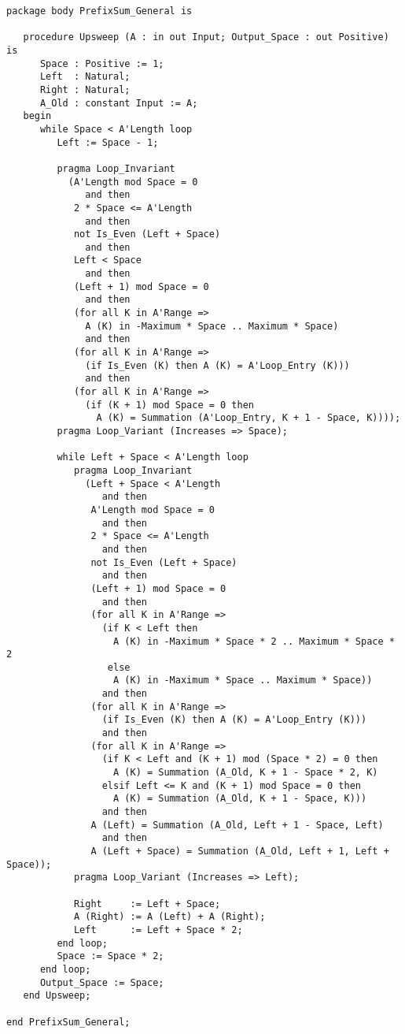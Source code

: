 \documentclass[sttt,draft]{svjour}
\begin{document}
\begin{footnotesize}
\begin{verbatim}
package body PrefixSum_General is

   procedure Upsweep (A : in out Input; Output_Space : out Positive) is
      Space : Positive := 1;
      Left  : Natural;
      Right : Natural;
      A_Old : constant Input := A;
   begin
      while Space < A'Length loop
         Left := Space - 1;

         pragma Loop_Invariant
           (A'Length mod Space = 0
              and then
            2 * Space <= A'Length
              and then
            not Is_Even (Left + Space)
              and then
            Left < Space
              and then
            (Left + 1) mod Space = 0
              and then
            (for all K in A'Range =>
              A (K) in -Maximum * Space .. Maximum * Space)
              and then
            (for all K in A'Range =>
              (if Is_Even (K) then A (K) = A'Loop_Entry (K)))
              and then
            (for all K in A'Range =>
              (if (K + 1) mod Space = 0 then
                A (K) = Summation (A'Loop_Entry, K + 1 - Space, K))));
         pragma Loop_Variant (Increases => Space);

         while Left + Space < A'Length loop
            pragma Loop_Invariant
              (Left + Space < A'Length
                 and then
               A'Length mod Space = 0
                 and then
               2 * Space <= A'Length
                 and then
               not Is_Even (Left + Space)
                 and then
               (Left + 1) mod Space = 0
                 and then
               (for all K in A'Range =>
                 (if K < Left then
                   A (K) in -Maximum * Space * 2 .. Maximum * Space * 2
                  else
                   A (K) in -Maximum * Space .. Maximum * Space))
                 and then
               (for all K in A'Range =>
                 (if Is_Even (K) then A (K) = A'Loop_Entry (K)))
                 and then
               (for all K in A'Range =>
                 (if K < Left and (K + 1) mod (Space * 2) = 0 then
                   A (K) = Summation (A_Old, K + 1 - Space * 2, K)
                 elsif Left <= K and (K + 1) mod Space = 0 then
                   A (K) = Summation (A_Old, K + 1 - Space, K)))
                 and then
               A (Left) = Summation (A_Old, Left + 1 - Space, Left)
                 and then
               A (Left + Space) = Summation (A_Old, Left + 1, Left + Space));
            pragma Loop_Variant (Increases => Left);

            Right     := Left + Space;
            A (Right) := A (Left) + A (Right);
            Left      := Left + Space * 2;
         end loop;
         Space := Space * 2;
      end loop;
      Output_Space := Space;
   end Upsweep;

end PrefixSum_General;

\end{verbatim}
\end{footnotesize}
\end{document}
